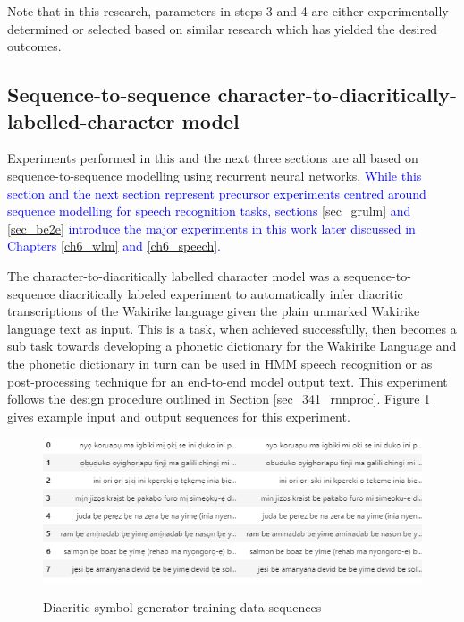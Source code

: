 Note that in this research, parameters in steps 3 and 4 are either experimentally determined or selected based on similar research which has yielded the desired outcomes.

\stopblue

\subsection{Sequence-to-sequence character-to-diacritically-labelled-character model}\label{sec_c2d}
Experiments performed in this and the next three sections are all based on sequence-to-sequence modelling using recurrent neural networks.  \textcolor{blue}{While this section and the next section represent precursor experiments centred around sequence modelling for speech recognition tasks, sections \ref{sec_grulm} and \ref{sec_be2e} introduce the major experiments in this work later discussed in Chapters \ref{ch6_wlm} and \ref{ch6_speech}.}

\startblue
The character-to-diacritically labelled character model was a sequence-to-sequence diacritically labeled experiment to automatically infer diacritic transcriptions of the Wakirike language given the plain unmarked Wakirike language text as input.  This is a task, when achieved successfully, then becomes a sub task towards developing a phonetic dictionary for the Wakirike Language and the phonetic dictionary in turn can be used in HMM speech recognition or as post-processing technique for an end-to-end model output text.  This experiment follows the design procedure outlined in Section \ref{sec_341_rnnproc}. Figure \ref{fig_c3_t2d_sample} gives example input and output sequences for this experiment.

\begin{figure}
\centering
  \includegraphics[width=14cm]{thesis/images/diacritic.png}\\
  \caption{Diacritic symbol generator training data sequences}\label{fig_c3_t2d_sample}
\end{figure}

